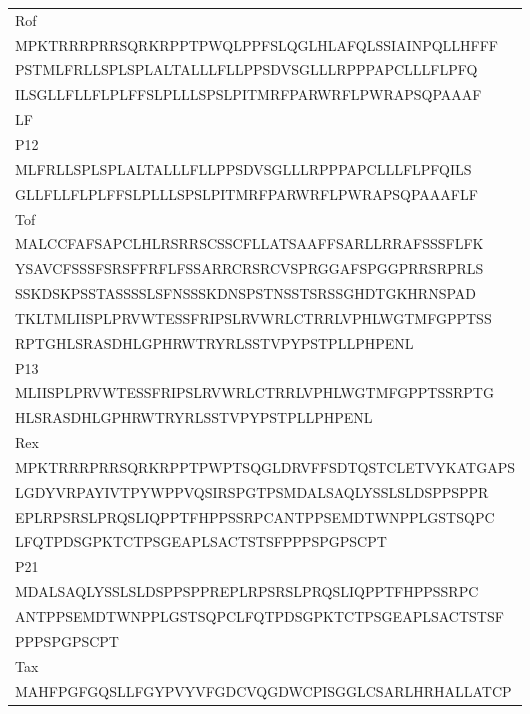 \begin{table}[htp]
\begin{center}
\begin{tabulary}{\textwidth}{|L|}
\hline
Rof \bigstrut[t] \\
MPKTRRRPRRSQRKRPPTPWQLPPFSLQGLHLAFQLSSIAINPQLLHFFF \bigstrut[t] \\
PSTMLFRLLSPLSPLALTALLLFLLPPSDVSGLLLRPPPAPCLLLFLPFQ \\
ILSGLLFLLFLPLFFSLPLLLSPSLPITMRFPARWRFLPWRAPSQPAAAF \\
LF \bigstrut[b] \\
\hline
P12 \bigstrut[t] \\
MLFRLLSPLSPLALTALLLFLLPPSDVSGLLLRPPPAPCLLLFLPFQILS \bigstrut[t] \\
GLLFLLFLPLFFSLPLLLSPSLPITMRFPARWRFLPWRAPSQPAAAFLF \bigstrut[b] \\
\hline
Tof \bigstrut[t] \\
MALCCFAFSAPCLHLRSRRSCSSCFLLATSAAFFSARLLRRAFSSSFLFK \bigstrut[t] \\
YSAVCFSSSFSRSFFRFLFSSARRCRSRCVSPRGGAFSPGGPRRSRPRLS \\
SSKDSKPSSTASSSSLSFNSSSKDNSPSTNSSTSRSSGHDTGKHRNSPAD \\
TKLTMLIISPLPRVWTESSFRIPSLRVWRLCTRRLVPHLWGTMFGPPTSS \\
RPTGHLSRASDHLGPHRWTRYRLSSTVPYPSTPLLPHPENL \bigstrut[b] \\
\hline 
P13 \bigstrut[t] \\
MLIISPLPRVWTESSFRIPSLRVWRLCTRRLVPHLWGTMFGPPTSSRPTG \bigstrut[t] \\
HLSRASDHLGPHRWTRYRLSSTVPYPSTPLLPHPENL \bigstrut[b] \\
\hline
Rex \bigstrut[t] \\
MPKTRRRPRRSQRKRPPTPWPTSQGLDRVFFSDTQSTCLETVYKATGAPS \bigstrut[t] \\
LGDYVRPAYIVTPYWPPVQSIRSPGTPSMDALSAQLYSSLSLDSPPSPPR \\
EPLRPSRSLPRQSLIQPPTFHPPSSRPCANTPPSEMDTWNPPLGSTSQPC \\
LFQTPDSGPKTCTPSGEAPLSACTSTSFPPPSPGPSCPT \bigstrut[b] \\
\hline
P21 \bigstrut[t] \\
MDALSAQLYSSLSLDSPPSPPREPLRPSRSLPRQSLIQPPTFHPPSSRPC \bigstrut[t] \\
ANTPPSEMDTWNPPLGSTSQPCLFQTPDSGPKTCTPSGEAPLSACTSTSF \\
PPPSPGPSCPT \bigstrut[b] \\
\hline
Tax \bigstrut[t] \\
MAHFPGFGQSLLFGYPVYVFGDCVQGDWCPISGGLCSARLHRHALLATCP \bigstrut[t] \\

\end{tabulary}
\end{center}
\end{table}
